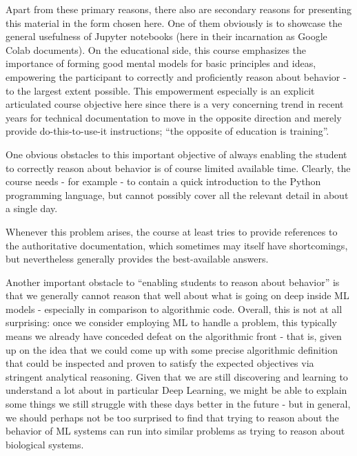\documentclass[11pt]{article}
\begin{document}
Apart from these primary reasons, there also are secondary reasons for
presenting this material in the form chosen here. One of them obviously
is to showcase the general usefulness of Jupyter notebooks (here in
their incarnation as Google Colab documents). On the educational side,
this course emphasizes the importance of forming good mental models for
basic principles and ideas, empowering the participant to correctly and
proficiently reason about behavior - to the largest extent possible.
This empowerment especially is an explicit articulated course objective
here since there is a very concerning trend in recent years for
technical documentation to move in the opposite direction and merely
provide do-this-to-use-it instructions; ``the opposite of education is
training''.

One obvious obstacles to this important objective of always enabling the
student to correctly reason about behavior is of course limited
available time. Clearly, the course needs - for example - to contain a
quick introduction to the Python programming language, but cannot
possibly cover all the relevant detail in about a single day.

Whenever this problem arises, the course at least tries to provide
references to the authoritative documentation, which sometimes may
itself have shortcomings, but nevertheless generally provides the
best-available answers.

Another important obstacle to ``enabling students to reason about
behavior'' is that we generally cannot reason that well about what is
going on deep inside ML models - especially in comparison to algorithmic
code. Overall, this is not at all surprising: once we consider employing
ML to handle a problem, this typically means we already have conceded
defeat on the algorithmic front - that is, given up on the idea that we
could come up with some precise algorithmic definition that could be
inspected and proven to satisfy the expected objectives via stringent
analytical reasoning. Given that we are still discovering and learning
to understand a lot about in particular Deep Learning, we might be able
to explain some things we still struggle with these days better in the
future - but in general, we should perhaps not be too surprised to find
that trying to reason about the behavior of ML systems can run into
similar problems as trying to reason about biological systems.

    
    
    
    
\end{document}
